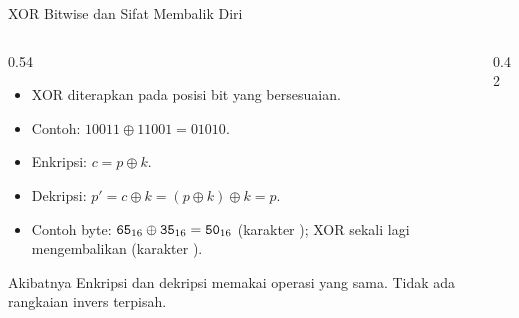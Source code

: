 \documentclass[aspectratio=169,11pt]{beamer}
\begin{document}
\begin{frame}{XOR Bitwise dan Sifat Membalik Diri}
    \footnotesize
    \begin{columns}[T,onlytextwidth]
        \begin{column}{0.54\textwidth}
            \begin{itemize}
                \item XOR diterapkan pada posisi bit yang bersesuaian.
                \item Contoh: $10011\oplus11001=01010$.
                \item Enkripsi: $c=p\oplus k$.
                \item Dekripsi:
                      $p'=c\oplus k=(p\oplus k)\oplus k=p$.
                \item Contoh byte: $\texttt{65}_{16}\oplus\texttt{35}_{16}
                      =\texttt{50}_{16}$ (karakter ); XOR sekali lagi
                      mengembalikan  (karakter ).
            \end{itemize}
            \begin{block}{Akibatnya}
                Enkripsi dan dekripsi memakai operasi yang sama. Tidak ada
                rangkaian invers terpisah.
            \end{block}
        \end{column}
        \begin{column}{0.42\textwidth}
            \centering
        \end{column}
    \end{columns}
\end{frame}
\end{document}

